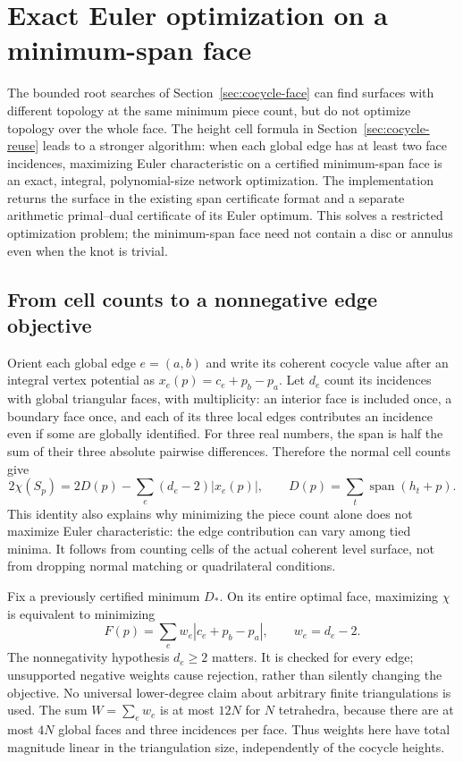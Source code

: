\section{Exact Euler optimization on a minimum-span face}
\label{sec:cocycle-euler}

The bounded root searches of Section~\ref{sec:cocycle-face} can find surfaces
with different topology at the same minimum piece count, but do not optimize
topology over the whole face. The height cell formula in
Section~\ref{sec:cocycle-reuse} leads to a stronger algorithm: when each global
edge has at least two face incidences, maximizing Euler characteristic on a
certified minimum-span face is an exact, integral, polynomial-size network
optimization. The implementation returns the surface in the existing span
certificate format and a separate arithmetic primal--dual certificate of its
Euler optimum. This solves a restricted optimization problem; the minimum-span
face need not contain a disc or annulus even when the knot is trivial.

\subsection{From cell counts to a nonnegative edge objective}

Orient each global edge $e=(a,b)$ and write its coherent cocycle value after an
integral vertex potential as $x_e(p)=c_e+p_b-p_a$. Let $d_e$ count its incidences with
global triangular faces, with multiplicity: an interior face is included
once, a boundary face once, and each of its three local edges contributes an
incidence even if some are globally identified. For three real numbers, the
span is half the sum of their three absolute pairwise differences. Therefore
the normal cell counts give
\[
  2\chi(S_p)=2D(p)-\sum_e(d_e-2)|x_e(p)|,
  \qquad D(p)=\sum_t\operatorname{span}(h_t+p).
\]
This identity also explains why minimizing the piece count alone does not
maximize Euler characteristic: the edge contribution can vary among tied
minima. It follows from counting cells of the actual coherent level surface,
not from dropping normal matching or quadrilateral conditions.

Fix a previously certified minimum $D_*$. On its entire optimal face,
maximizing $\chi$ is equivalent to minimizing
\[
  F(p)=\sum_e w_e|c_e+p_b-p_a|,\qquad w_e=d_e-2.
\]
The nonnegativity hypothesis $d_e\geq2$ matters. It is checked for every edge;
unsupported negative weights cause rejection, rather than silently changing
the objective. No universal lower-degree claim about arbitrary finite
triangulations is used. The sum $W=\sum_e w_e$ is at most $12N$ for $N$
tetrahedra, because there are at most $4N$ global faces and three incidences
per face. Thus weights here have total magnitude linear in the triangulation
size, independently of the cocycle heights.


